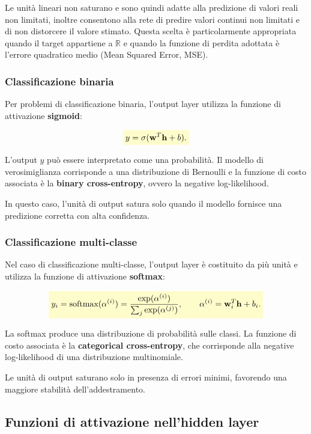 \documentclass[a4paper,12pt]{report}
\newcommand{\highlight}[1]{%
\colorbox{yellow!20}{$\displaystyle #1$}%
}
\begin{document}
Le unità lineari non saturano e sono quindi adatte alla predizione di valori reali non limitati, inoltre
consentono alla rete di predire valori continui non limitati e di non distorcere il valore stimato.
Questa scelta è particolarmente appropriata quando il target appartiene a $\mathbb{R}$ e quando la funzione di perdita adottata è l’errore quadratico medio (Mean Squared Error, MSE).

\subsubsection{Classificazione binaria}

Per problemi di classificazione binaria, l’output layer utilizza la funzione di attivazione \textbf{sigmoid}:

\[
\highlight{
y = \sigma(\mathbf{w}^T \mathbf{h} + b).}
\]

L’output $y$ può essere interpretato come una probabilità.  
Il modello di verosimiglianza corrisponde a una distribuzione di Bernoulli e la funzione di costo associata è la \textbf{binary cross-entropy}, ovvero la negative log-likelihood.

In questo caso, l’unità di output satura solo quando il modello fornisce una predizione corretta con alta confidenza.

\subsubsection{Classificazione multi-classe}

Nel caso di classificazione multi-classe, l’output layer è costituito da più unità e utilizza la funzione di attivazione \textbf{softmax}:

\[
\highlight{
y_i = \text{softmax}(\alpha^{(i)}) = 
\frac{\exp(\alpha^{(i)})}{\sum_j \exp(\alpha^{(j)})},
\qquad
\alpha^{(i)} = \mathbf{w}_i^T \mathbf{h} + b_i.}
\]

La softmax produce una distribuzione di probabilità sulle classi.  
La funzione di costo associata è la \textbf{categorical cross-entropy}, che corrisponde alla negative log-likelihood di una distribuzione multinomiale.

Le unità di output saturano solo in presenza di errori minimi, favorendo una maggiore stabilità dell’addestramento.


\subsection{Funzioni di attivazione nell'hidden layer}
\end{document}
